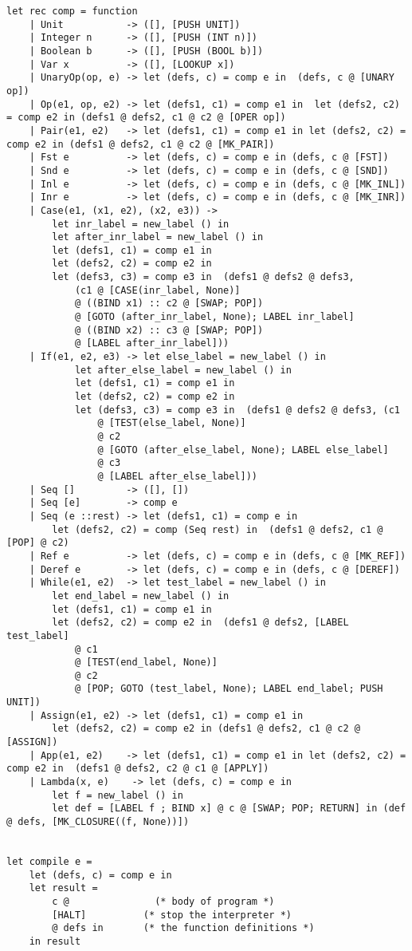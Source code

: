 \documentclass{article}
\begin{document}
\begin{lstlisting}
let rec comp = function 
	| Unit           -> ([], [PUSH UNIT]) 
	| Integer n      -> ([], [PUSH (INT n)]) 
	| Boolean b      -> ([], [PUSH (BOOL b)])
	| Var x          -> ([], [LOOKUP x]) 
	| UnaryOp(op, e) -> let (defs, c) = comp e in  (defs, c @ [UNARY op])
	| Op(e1, op, e2) -> let (defs1, c1) = comp e1 in  let (defs2, c2) = comp e2 in (defs1 @ defs2, c1 @ c2 @ [OPER op])
	| Pair(e1, e2)   -> let (defs1, c1) = comp e1 in let (defs2, c2) = comp e2 in (defs1 @ defs2, c1 @ c2 @ [MK_PAIR]) 
	| Fst e          -> let (defs, c) = comp e in (defs, c @ [FST])
	| Snd e          -> let (defs, c) = comp e in (defs, c @ [SND])
	| Inl e          -> let (defs, c) = comp e in (defs, c @ [MK_INL])
	| Inr e          -> let (defs, c) = comp e in (defs, c @ [MK_INR])
	| Case(e1, (x1, e2), (x2, e3)) -> 
		let inr_label = new_label () in 
		let after_inr_label = new_label () in 
		let (defs1, c1) = comp e1 in  
		let (defs2, c2) = comp e2 in  
		let (defs3, c3) = comp e3 in  (defs1 @ defs2 @ defs3, 
			(c1 @ [CASE(inr_label, None)] 
			@ ((BIND x1) :: c2 @ [SWAP; POP])
			@ [GOTO (after_inr_label, None); LABEL inr_label] 
			@ ((BIND x2) :: c3 @ [SWAP; POP])
			@ [LABEL after_inr_label]))
	| If(e1, e2, e3) -> let else_label = new_label () in 
			let after_else_label = new_label () in 
			let (defs1, c1) = comp e1 in  
			let (defs2, c2) = comp e2 in  
			let (defs3, c3) = comp e3 in  (defs1 @ defs2 @ defs3, (c1 
				@ [TEST(else_label, None)] 
				@ c2 
				@ [GOTO (after_else_label, None); LABEL else_label] 
				@ c3 
				@ [LABEL after_else_label]))   
	| Seq []         -> ([], [])  
	| Seq [e]        -> comp e
	| Seq (e ::rest) -> let (defs1, c1) = comp e in  
		let (defs2, c2) = comp (Seq rest) in  (defs1 @ defs2, c1 @ [POP] @ c2)
	| Ref e          -> let (defs, c) = comp e in (defs, c @ [MK_REF])
	| Deref e        -> let (defs, c) = comp e in (defs, c @ [DEREF])
	| While(e1, e2)  -> let test_label = new_label () in 
		let end_label = new_label () in 
		let (defs1, c1) = comp e1 in  
		let (defs2, c2) = comp e2 in  (defs1 @ defs2, [LABEL test_label]
			@ c1 
			@ [TEST(end_label, None)] 
			@ c2 
			@ [POP; GOTO (test_label, None); LABEL end_label; PUSH UNIT])
	| Assign(e1, e2) -> let (defs1, c1) = comp e1 in  
		let (defs2, c2) = comp e2 in (defs1 @ defs2, c1 @ c2 @ [ASSIGN])
	| App(e1, e2)    -> let (defs1, c1) = comp e1 in let (defs2, c2) = comp e2 in  (defs1 @ defs2, c2 @ c1 @ [APPLY]) 
	| Lambda(x, e)    -> let (defs, c) = comp e in  
		let f = new_label () in 
		let def = [LABEL f ; BIND x] @ c @ [SWAP; POP; RETURN] in (def @ defs, [MK_CLOSURE((f, None))])
	
	
let compile e = 
	let (defs, c) = comp e in 
	let result = 
		c @               (* body of program *) 
		[HALT]          (* stop the interpreter *) 
		@ defs in       (* the function definitions *) 
	in result

\end{lstlisting}
\end{document}
